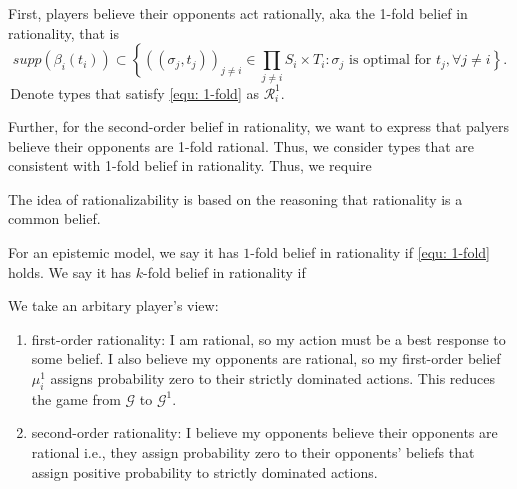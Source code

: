 First, players believe their opponents act rationally, aka the 1-fold belief in rationality, that is 
\begin{equation}\label{equ: 1-fold}
    supp(\beta_i(t_i))\subset \left\{((\sigma_j,t_j))_{j\neq i}\in \right.\prod_{j\neq i} \left.S_i\times T_i: \sigma_j\text{ is optimal for }t_j, \forall j\neq i\right\}. 
\end{equation}
\,Denote types that satisfy \eqref{equ: 1-fold} as $\mathcal{R}^1_i$. 

Further, for the second-order belief in rationality, we want to express that palyers believe their opponents are 1-fold rational. Thus, we
consider types that are consistent with 1-fold belief in rationality. Thus, we require

The idea of rationalizability is based on the reasoning that rationality is a common belief. 
\begin{definition}
    For an epistemic model, we say it has $1$-fold belief in rationality if \eqref{equ: 1-fold} holds. We say it has $k$-fold belief in rationality if
\end{definition}

We take an arbitary player's view:
\begin{enumerate}
    \item  first-order rationality: I am rational, so my action must be a best response to some belief. I also believe my opponents are rational, so my first-order belief $\mu_i^1$ assigns probability zero to their strictly dominated actions. This reduces the game from $\mathcal{G}$ to $\mathcal{G}^1$.
    \item second-order rationality: I believe my opponents believe their opponents are rational i.e., they assign probability zero to their opponents' beliefs that assign positive probability to strictly dominated actions. 
\end{enumerate}
